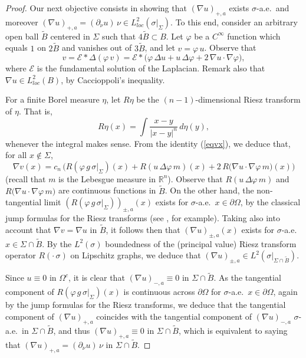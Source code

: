 \documentclass[11pt]{amsart}
\newcommand{\R}{{\mathbb R}}       %
\newcommand{\EE}{{\mathcal E}}
\newcommand{\rf}[1]{{(\ref{#1})}}
\newcommand{\vphi}{{\varphi}}
\newcommand{\wt}[1]{{\widetilde{#1}}}
\theoremstyle{definition}
\theoremstyle{remark}
\numberwithin{equation}{section}
\begin{document}
\begin{proof}
Our next objective consists in showing that
$(\nabla u)_{+,a}$ exists $\sigma$-a.e.\ and moreover $(\nabla u)_{+,a} = (\partial_\nu u)\,\nu \in L^2_{loc}(\sigma|_\Sigma)$. To this end, consider an arbitrary open ball $\wt B$ centered in $\Sigma$ such that
$4\wt B\subset B$. Let $\vphi$ be a $C^\infty$ function which equals $1$ on $2\wt B$ and vanishes out of $3\wt B$, and let $v=\vphi\, u$. Observe that
\begin{equation}\label{eqvx}
v = \EE * \Delta(\vphi\,v) = \EE * \big(\vphi\,\Delta u + u\,\Delta\vphi + 2\,\nabla u \cdot \nabla \vphi\big),
\end{equation}
where $\EE$ is the fundamental solution of the Laplacian. Remark also that 
$\nabla u\in L^2_{loc}(B)$, by Caccioppoli's inequality.
 
For a finite Borel measure $\eta$, let $R\eta$ be the $(n-1)$-dimensional Riesz transform of
$\eta$. That is,
$$R\eta(x) = \int \frac{x-y}{|x-y|^n}\,d\eta(y),$$
whenever the integral makes sense.
From the identity \rf{eqvx}, we deduce that, for all $x\not \in\Sigma$,
$$\nabla v(x) = c_n\,\big(R(\vphi\,g\,\sigma|_\Sigma)(x) + R(u\,\Delta\vphi\,m)(x) + 2\,R(\nabla u \cdot \nabla \vphi \,m\big)(x)\big)$$
(recall that $m$ is the Lebesgue measure in $\R^n$). Observe that 
$R(u\,\Delta\vphi\,m)$ and 
$R(\nabla u \cdot \nabla \vphi \,m\big)$ are continuous functions in $\wt B$.
On the other hand, the non-tangential limit $(R(\vphi\,g\,\sigma|_\Sigma))_{\pm,a}(x)$ exists for $\sigma$-a.e.\ $x\in\partial\Omega$, by the classical jump formulas for the Riesz transforms
(see \cite{Tolsa-jumps}, for example). 
Taking also into account that $\nabla v=\nabla u$ in $\wt B$, it follows then that
$(\nabla u)_{\pm,a}(x)$  exists for $\sigma$-a.e.\ $x\in\Sigma\cap \wt B$. By the $L^2(\sigma)$
boundedness of the (principal value) Riesz transform operator $R(\cdot\,\sigma)$ on Lipschitz graphs, we deduce that 
$(\nabla u)_{\pm,a}\in L^2(\sigma|_{\Sigma\cap\wt B})$. 

Since $u\equiv0$ in
$\Omega^c$, it is clear that $(\nabla u)_{-,a}\equiv0$ in $\Sigma\cap\wt B$. As the tangential component of $R(\vphi\,g\,\sigma|_\Sigma)(x)$ is continuous across $\partial\Omega$ for $\sigma$-a.e.\ $x\in\partial\Omega$, again by the jump formulas for the Riesz transforms, we deduce that the tangential component of $(\nabla u)_{+,a}$ coincides with
the tangential component of $(\nabla u)_{-,a}$ $\sigma$-a.e.\ in $\Sigma\cap\wt B$, and thus
$(\nabla u)_{+,a}\equiv0$ in $\Sigma\cap\wt B$, which is equivalent to saying that
$(\nabla u)_{+,a}
 = (\partial_\nu u)\,\nu$ in $\Sigma\cap\wt B$.


\end{proof}
\end{document}
